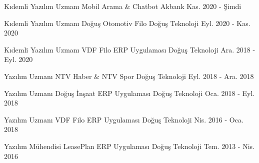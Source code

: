 

\begin{cventries}

  \cventry
    {Kıdemli Yazılım Uzmanı} %
    {Mobil Arama & Chatbot} %
    {Akbank} %
    {Kas. 2020 - Şimdi} %
    {}

  \cventry
    {Kıdemli Yazılım Uzmanı} %
    {Doğuş Otomotiv Filo} %
    {Doğuş Teknoloji} %
    {Eyl. 2020 - Kas. 2020} %
    {}

  \cventry
    {Kıdemli Yazılım Uzmanı} %
    {VDF Filo ERP Uygulaması} %
    {Doğuş Teknoloji} %
    {Ara. 2018 - Eyl. 2020} %
    {}

  \cventry
    {Yazılım Uzmanı} %
    {NTV Haber \& NTV Spor} %
    {Doğuş Teknoloji} %
    {Eyl. 2018 - Ara. 2018} %
    {}

  \cventry
    {Yazılım Uzmanı} %
    {Doğuş İnşaat ERP Uygulaması} %
    {Doğuş Teknoloji} %
    {Oca. 2018 - Eyl. 2018} %
    {}

  \cventry
    {Yazılım Uzmanı} %
    {VDF Filo ERP Uygulaması} %
    {Doğuş Teknoloji} %
    {Nis. 2016 - Oca. 2018} %
    {}

  \cventry
    {Yazılım Mühendisi} %
    {LeasePlan ERP Uygulaması} %
    {Doğuş Teknoloji} %
    {Tem. 2013 - Nis. 2016} %
    {}

\end{cventries}
